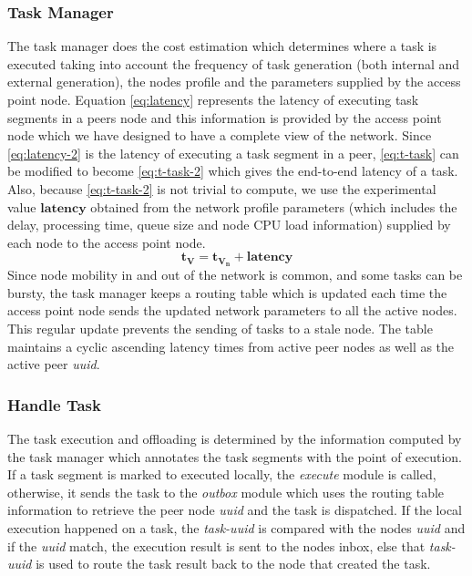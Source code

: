 \subsubsection{Task Manager}
The task manager does the cost estimation which determines 
where a task is executed taking into account the frequency of 
task generation (both internal and external generation), the 
nodes profile and the parameters supplied by the access 
point node. Equation \eqref{eq:latency} represents the 
latency of executing task segments in a peers node and 
this information is provided by the access point node which 
we have designed to have a complete view of the network. 
Since \eqref{eq:latency-2} is the latency of executing a task 
segment in a peer, \eqref{eq:t-task} can be modified to 
become \eqref{eq:t-task-2} which gives the end-to-end latency 
of a task. Also, because \eqref{eq:t-task-2} is not trivial 
to compute, we use the experimental value $ 
\bm{\text{latency}} $ obtained from the network profile 
parameters (which includes the delay, processing time, queue 
size and node CPU load information) supplied by each node to 
the access point node.
\begin{equation}
	\bm{t_{V} = t_{V_{n}} + \text{latency} }
	\label{eq:t-task-2}
\end{equation}
Since node mobility in and out of the network is 
common, and some tasks can be bursty, the task manager keeps 
a routing table which is updated each time the access point 
node sends the updated network parameters to all the active nodes. This regular update prevents the sending of tasks to a 
stale node. The table maintains a cyclic ascending 
latency times from active peer nodes as well as the active peer 
\emph{uuid}.
\subsubsection{Handle Task}
The task execution and offloading is determined by the 
information computed by the task manager which annotates the 
task segments with the point of execution. If a task segment 
is marked to executed locally, the \emph{execute} module is 
called, otherwise, it sends the task to the \emph{outbox} 
module which uses the routing table information to retrieve 
the peer node \emph{uuid} and the task is dispatched. If the 
local execution happened on a task, the \emph{task-uuid} is 
compared with the nodes \emph{uuid} and if the 
\emph{uuid} match, the execution result is sent to the 
nodes inbox, else that \emph{task-uuid} is used to route the 
task result back to the node that created the task.
